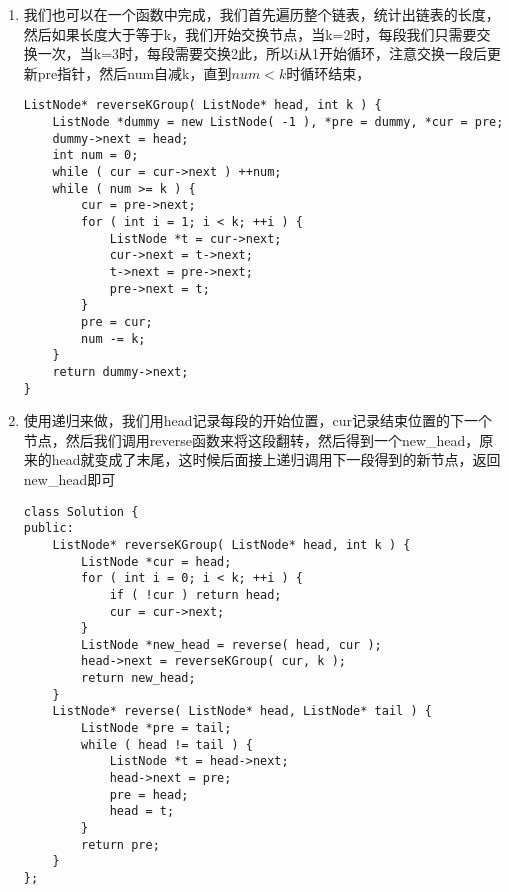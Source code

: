 \documentclass[12pt,a4paper]{article}
\begin{document}
\begin{enumerate}
\begin{lstlisting}
-1->3->2->1->4->5
          |  |
         pre next
\end{lstlisting}
\begin{CJK}{UTF8}{gbsn}
以此类推，只要next走过k个节点，就可以调用翻转函数来进行局部翻转了
\end{CJK}
\begin{lstlisting}
/**
* Definition for singly-linked list.
* struct ListNode {
*     int val;
*     ListNode *next;
*     ListNode(int x) : val(x), next(NULL) {}
* };
*/
class Solution {
public:
	ListNode *reverseKGroup( ListNode *head, int k ) {
		if ( !head || k == 1 ) return head;
		ListNode *dummy = new ListNode( -1 );
		ListNode *pre = dummy, *cur = head;
		dummy->next = head;
		int i = 0;
		while ( cur ) {
			++i;
			if ( i % k == 0 ) {
				pre = reverseOneGroup( pre, cur->next );
				cur = pre->next;
			}
			else {
				cur = cur->next;
			}
		}
		return dummy->next;
	}
	ListNode *reverseOneGroup( ListNode *pre, ListNode *next ) {
		ListNode *last = pre->next;
		ListNode *cur = last->next;
		while ( cur != next ) {
			last->next = cur->next;
			cur->next = pre->next;
			pre->next = cur;
			cur = last->next;
		}
		return last;
	}
};
\end{lstlisting}
\item
\begin{CJK}{UTF8}{gbsn}
我们也可以在一个函数中完成，我们首先遍历整个链表，统计出链表的长度，然后如果长度大于等于k，我们开始交换节点，当k=2时，每段我们只需要交换一次，当k=3时，每段需要交换2此，所以i从1开始循环，注意交换一段后更新pre指针，然后num自减k，直到$num<k$时循环结束，
\end{CJK}
\begin{lstlisting}
ListNode* reverseKGroup( ListNode* head, int k ) {
	ListNode *dummy = new ListNode( -1 ), *pre = dummy, *cur = pre;
	dummy->next = head;
	int num = 0;
	while ( cur = cur->next ) ++num;
	while ( num >= k ) {
		cur = pre->next;
		for ( int i = 1; i < k; ++i ) {
			ListNode *t = cur->next;
			cur->next = t->next;
			t->next = pre->next;
			pre->next = t;
		}
		pre = cur;
		num -= k;
	}
	return dummy->next;
}
\end{lstlisting}
\item
\begin{CJK}{UTF8}{gbsn}
使用递归来做，我们用head记录每段的开始位置，cur记录结束位置的下一个节点，然后我们调用reverse函数来将这段翻转，然后得到一个new\_head，原来的head就变成了末尾，这时候后面接上递归调用下一段得到的新节点，返回new\_head即可
\end{CJK}
\begin{lstlisting}
class Solution {
public:
	ListNode* reverseKGroup( ListNode* head, int k ) {
		ListNode *cur = head;
		for ( int i = 0; i < k; ++i ) {
			if ( !cur ) return head;
			cur = cur->next;
		}
		ListNode *new_head = reverse( head, cur );
		head->next = reverseKGroup( cur, k );
		return new_head;
	}
	ListNode* reverse( ListNode* head, ListNode* tail ) {
		ListNode *pre = tail;
		while ( head != tail ) {
			ListNode *t = head->next;
			head->next = pre;
			pre = head;
			head = t;
		}
		return pre;
	}
};
\end{lstlisting}
\end{enumerate}
\end{document}
